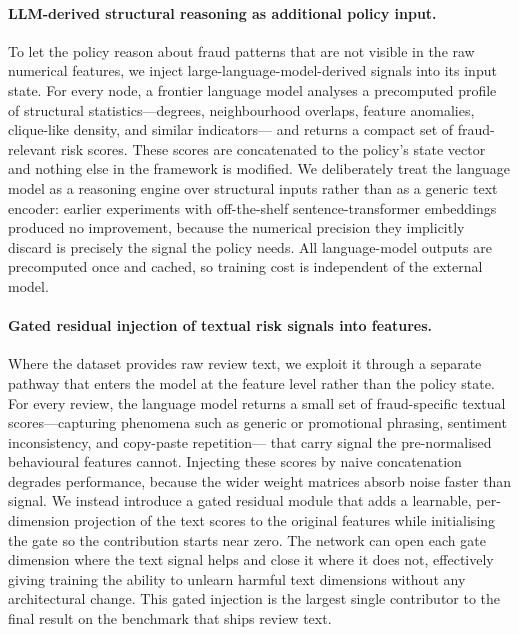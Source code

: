   \paragraph{LLM-derived structural reasoning as additional policy input.}
  To let the policy reason about fraud patterns that are not visible in the
  raw numerical features, we inject large-language-model-derived signals into
  its input state. For every node, a frontier language model analyses a
  precomputed profile of structural statistics---degrees, neighbourhood
  overlaps, feature anomalies, clique-like density, and similar indicators---
  and returns a compact set of fraud-relevant risk scores. These scores are
  concatenated to the policy's state vector and nothing else in the framework
  is modified. We deliberately treat the language model as a reasoning engine
  over structural inputs rather than as a generic text encoder: earlier
  experiments with off-the-shelf sentence-transformer embeddings produced no
  improvement, because the numerical precision they implicitly discard is
  precisely the signal the policy needs. All language-model outputs are
  precomputed once and cached, so training cost is independent of the external
  model.

  \paragraph{Gated residual injection of textual risk signals into features.}
  Where the dataset provides raw review text, we exploit it through a separate
  pathway that enters the model at the feature level rather than the policy
  state. For every review, the language model returns a small set of
  fraud-specific textual scores---capturing phenomena such as generic or
  promotional phrasing, sentiment inconsistency, and copy-paste repetition---
  that carry signal the pre-normalised behavioural features cannot. Injecting
  these scores by naive concatenation degrades performance, because the wider
  weight matrices absorb noise faster than signal. We instead introduce a
  gated residual module that adds a learnable, per-dimension projection of the
  text scores to the original features while initialising the gate so the
  contribution starts near zero. The network can open each gate dimension
  where the text signal helps and close it where it does not, effectively
  giving training the ability to unlearn harmful text dimensions without any
  architectural change. This gated injection is the largest single
  contributor to the final result on the benchmark that ships review text.




\clearpage
